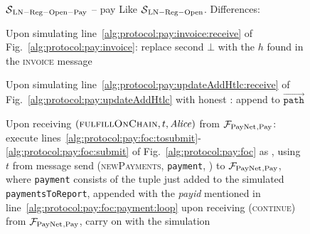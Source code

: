 \begin{figure}[!htbp]
  \begin{simulatorbox}{$\mathcal{S}{}_{\mathrm{LN - Reg - Open - Pay}}$ -- pay}
    Like $\mathcal{S}{}_{\mathrm{LN - Reg - Open}}$. Differences:
    \begin{algorithmic}[1]
      \State Upon simulating line~\ref{alg:protocol:pay:invoice:receive} of
      Fig.~\ref{alg:protocol:pay:invoice}:
      \Indent
          \State replace second $\bot$ with the $h$ found in the
          \textsc{invoice} message
        \EndIf
      \EndIndent
      \Statex

      \State Upon simulating line~\ref{alg:protocol:pay:updateAddHtlc:receive}
      of Fig.~\ref{alg:protocol:pay:updateAddHtlc} with honest \alice:
      \Indent
          \State append \alice{} to $\overrightarrow{\mathtt{path}}$
        \EndIf
      \EndIndent
      \Statex

      \State Upon receiving $\left(\textsc{fulfillOnChain}, t, \mathit{Alice}\right)$
      from $\mathcal{F}_{\mathrm{PayNet}}{}_{\mathrm{, Pay}}$:
      \label{alg:sim:pay:foc:top}
      \Indent
        \State execute
        lines~\ref{alg:protocol:pay:foc:tosubmit}-\ref{alg:protocol:pay:foc:submit}
        of Fig.~\ref{alg:protocol:pay:foc} as \alice{}, using $t$ from message
        \label{alg:sim:pay:foc:run}
        \label{alg:sim:foc:report:if}
          \State send (\textsc{newPayments}, \texttt{payment}, \alice) to
          $\mathcal{F}_{\mathrm{PayNet}}{}_{\mathrm{, Pay}}$, where \texttt{payment} consists of the
          tuple just added to the simulated \texttt{paymentsToReport}, appended
          with the \textit{payid} mentioned in
          line~\ref{alg:protocol:pay:foc:payment:loop}
          \label{alg:sim:foc:report}
          \State upon receiving (\textsc{continue}) from $\mathcal{F}_{\mathrm{PayNet}}{}_{\mathrm{,
          Pay}}$, carry on with the simulation
        \EndIf
      \EndIndent
      \Statex


\end{algorithmic}
\end{simulatorbox}
\end{figure}

